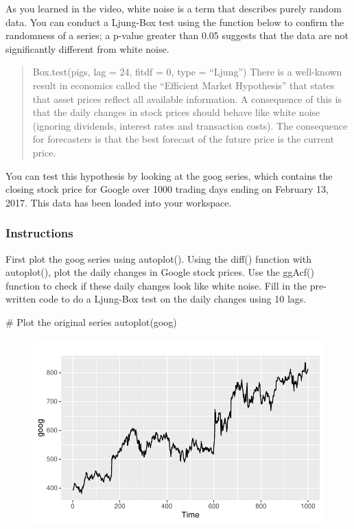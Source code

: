 \documentclass[
  letterpaper,
  DIV=11,
  numbers=noendperiod]{scrartcl}
\newenvironment{Shaded}{\begin{snugshade}}{\end{snugshade}}
\newcommand{\CommentTok}[1]{\textcolor[rgb]{0.37,0.37,0.37}{#1}}
\newcommand{\FunctionTok}[1]{\textcolor[rgb]{0.28,0.35,0.67}{#1}}
\newcommand{\NormalTok}[1]{\textcolor[rgb]{0.00,0.23,0.31}{#1}}
\begin{document}
As you learned in the video, white noise is a term that describes purely
random data. You can conduct a Ljung-Box test using the function below
to confirm the randomness of a series; a p-value greater than 0.05
suggests that the data are not significantly different from white noise.

\begin{quote}
Box.test(pigs, lag = 24, fitdf = 0, type = ``Ljung'') There is a
well-known result in economics called the ``Efficient Market
Hypothesis'' that states that asset prices reflect all available
information. A consequence of this is that the daily changes in stock
prices should behave like white noise (ignoring dividends, interest
rates and transaction costs). The consequence for forecasters is that
the best forecast of the future price is the current price.
\end{quote}

You can test this hypothesis by looking at the goog series, which
contains the closing stock price for Google over 1000 trading days
ending on February 13, 2017. This data has been loaded into your
workspace.

\hypertarget{instructions-3}{%
\subsubsection{Instructions}\label{instructions-3}}

First plot the goog series using autoplot(). Using the diff() function
with autoplot(), plot the daily changes in Google stock prices. Use the
ggAcf() function to check if these daily changes look like white noise.
Fill in the pre-written code to do a Ljung-Box test on the daily changes
using 10 lags.

\begin{Shaded}
\begin{Highlighting}[]
\CommentTok{\# Plot the original series}
\FunctionTok{autoplot}\NormalTok{(goog)}
\end{Highlighting}
\end{Shaded}

\begin{figure}[H]

{\centering \includegraphics{forecasting_datacamp_ex_files/figure-pdf/unnamed-chunk-6-1.pdf}

}

\end{figure}
\end{document}
